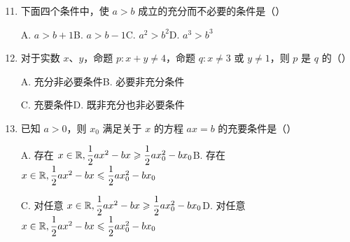 \documentclass[a4paper,11pt]{article}
\begin{document}
\begin{enumerate}
\setcounter{enumi}{10}

\item 下面四个条件中，使 $a>b$ 成立的充分而不必要的条件是\mbox{（\quad）}

\keepwithprev
A. $a>b+1$\qquad B. $a>b-1$\qquad C. $a^2>b^2$\qquad D. $a^3>b^3$


\ifanswer
\solbegin
{}
\solend

\fi

\item 对于实数 $x$、$y$，命题 $p:x+y\neq4$，命题 $q:x\neq3$ 或 $y\neq1$，则 $p$ 是 $q$ 的\mbox{（\quad）}

\keepwithprev
A. 充分非必要条件\qquad B. 必要非充分条件

C. 充要条件\qquad D. 既非充分也非必要条件


\item 已知 $a>0$，则 $x_0$ 满足关于 $x$ 的方程 $ax=b$ 的充要条件是\mbox{（\quad）}

\keepwithprev
A. 存在 $x\in\mathbb{R},\dfrac12ax^2-bx\geqslant\dfrac12ax_0^2-bx_0$\qquad B. 存在 $x\in\mathbb{R},\dfrac12ax^2-bx\leqslant\dfrac12ax_0^2-bx_0$

C. 对任意 $x\in\mathbb{R},\dfrac12ax^2-bx\geqslant\dfrac12ax_0^2-bx_0$\qquad D. 对任意 $x\in\mathbb{R},\dfrac12ax^2-bx\leqslant\dfrac12ax_0^2-bx_0$


\ifanswer
\solbegin
{}
\solend

\fi

\end{enumerate}

\end{document}
